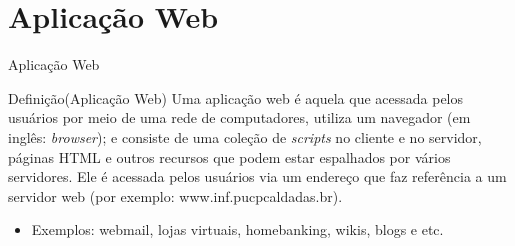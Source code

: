 \section{Aplicação Web}

\begin{frame}{Aplicação Web}
  \begin{exampleblock}{Definição(Aplicação Web)}
    Uma \alert{aplicação web} é aquela que acessada pelos usuários por meio de uma \alert{rede de computadores}, utiliza
    um \alert{navegador} (em inglês: \textit{browser}); e consiste de uma coleção de \alert{\textit{scripts}} no cliente e 
    no servidor, páginas \alert{HTML} e outros recursos que podem estar espalhados por vários servidores. Ele é 
    acessada pelos usuários via \alert{um endereço} que faz referência a um servidor web (por exemplo: www.inf.pucpcaldadas.br).
  \end{exampleblock}
  
  \begin{itemize}
    \item Exemplos: webmail, lojas virtuais, homebanking, wikis, blogs e etc.
  \end{itemize}
  
\framebreak


\end{frame}
